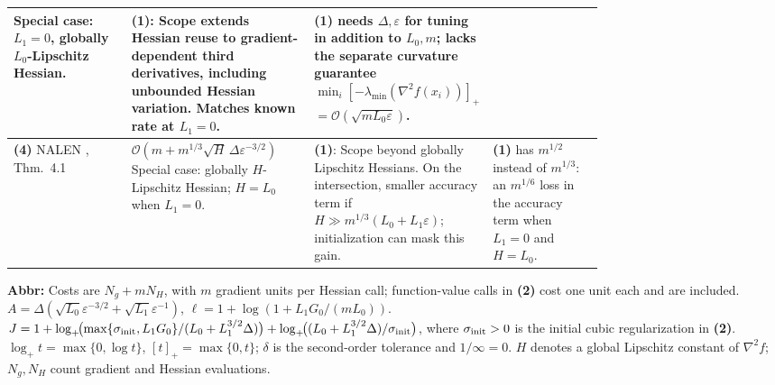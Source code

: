 \begin{table}[tp]
\begin{threeparttable}
\begin{tabularx}{\linewidth}{@{}>{\raggedright\arraybackslash}p{0.20\linewidth}>{\raggedright\arraybackslash}p{0.31\linewidth}>{\raggedright\arraybackslash}p{0.25\linewidth}>{\raggedright\arraybackslash}X@{}}
Special case: $L_1=0$, globally $L_0$-Lipschitz Hessian.
& \textbf{(1)}: Scope extends Hessian reuse to gradient-dependent third derivatives, including unbounded Hessian variation. Matches known rate at $L_1=0$.
& \textbf{(1)} needs $\Delta,\varepsilon$ for tuning in addition to $L_0,m$; lacks the separate curvature guarantee $\min_i[-\lambda_{\min}(\nabla^2f(x_i))]_+$ $=\mathcal{O}(\sqrt{mL_0\varepsilon})$. \\
\midrule
\textbf{(4)} NALEN \citep{CompositeLHChen2026}, Thm.~4.1
& $\mathcal{O}\!\left(m+m^{1/3}\sqrt H\,\Delta\varepsilon^{-3/2}\right)$\newline
Special case: globally $H$-Lipschitz Hessian; $H=L_0$ when $L_1=0$.
& \textbf{(1)}: Scope beyond globally Lipschitz Hessians. On the intersection, smaller accuracy term if $H\gg m^{1/3}(L_0+L_1\varepsilon)$; initialization can mask this gain.
& \textbf{(1)} has $m^{1/2}$ instead of $m^{1/3}$: an $m^{1/6}$ loss in the accuracy term when $L_1=0$ and $H=L_0$. \\
\bottomrule
\end{tabularx}
\begin{tablenotes}[flushleft]\footnotesize
\item[] \textbf{Abbr:} Costs are $N_g+mN_H$, with $m$ gradient units per Hessian call; function-value calls in \textbf{(2)} cost one unit each and are included. $A=\Delta(\sqrt{L_0}\varepsilon^{-3/2}+\sqrt{L_1}\varepsilon^{-1})$, $\ell=1+\log(1+L_1G_0/(mL_0))$. $J=1+\log_+\!\bigl(\max\{\sigma_{\rm init},L_1G_0\}/(L_0+L_1^{3/2}\Delta)\bigr)+\log_+\!\bigl((L_0+L_1^{3/2}\Delta)/\sigma_{\rm init}\bigr)$, where $\sigma_{\rm init}>0$ is the initial cubic regularization in \textbf{(2)}. $\log_+t=\max\{0,\log t\}$, $[t]_+=\max\{0,t\}$; $\delta$ is the second-order tolerance and $1/\infty=0$. $H$ denotes a global Lipschitz constant of $\nabla^2f$; $N_g,N_H$ count gradient and Hessian evaluations.
\end{tablenotes}
\end{threeparttable}
\end{table}
\clearpage
